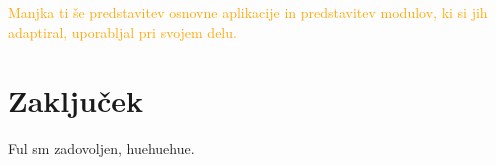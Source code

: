 \documentclass[a4paper, 12pt]{book}
\begin{document}
\textcolor{orange}{Manjka ti še predstavitev osnovne aplikacije in predstavitev modulov, ki si jih adaptiral, uporabljal pri svojem delu.}


\chapter{Zaključek}
Ful sm zadovoljen, huehuehue.
\end{document}
